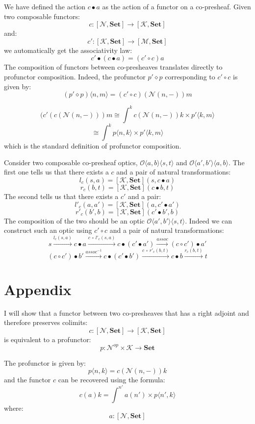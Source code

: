 \documentclass[11pt]{amsart}
\newcommand{\cat}[1]{\mathcal{#1}}%
\newcommand{\Cat}[1]{\mathbf{#1}}%
\newcommand{\Set}{\Cat{Set}}
\begin{document}
 We have defined the action $c \bullet a$ as the action of a functor on a co-presheaf. Given two composable functors:
\[ c \colon  [\cat N, \Set] \to [\cat K, \Set] \]
and:
\[ c' \colon  [\cat K, \Set] \to [\cat M, \Set] \]
we automatically get the associativity law:
\[ c' \bullet (c \bullet a) = (c' \circ c) a \]
The composition of functors between co-presheaves translates directly to profunctor composition. Indeed, the profunctor $p' \diamond p$ corresponding to $c' \circ c$ is given by:
\[(p' \diamond p) \langle n, m \rangle = (c' \circ c) ( \cat N(n, -)) m \]

\[(c' ( c ( \cat N(n, -))) m 
 \cong \int^{k} c ( \cat N(n, -)) k \times p' \langle k, m \rangle \]
\[  \cong \int^{k} p \langle n, k \rangle \times p' \langle k, m \rangle \]
which is the standard definition of profunctor composition. 

Consider two composable co-presheaf optics, $\mathcal{O}\langle a, b\rangle \langle s, t \rangle$ and $\mathcal{O}\langle a', b' \rangle \langle a, b \rangle$. The first one tells us that there exists a $c$ and a pair of natural transformations:
\[ l_c (s,  a ) = [\cat K, \Set] \left(s,  c \bullet a \right) \] 
\[ r_c (b, t) = [\cat K, \Set] \left(c \bullet b, t \right) \]
The second tells us that there exists a $c'$ and a pair:
\[ l'_c (a,  a' ) = [\cat K, \Set] \left(a,  c' \bullet a' \right) \] 
\[ r'_c (b', b) = [\cat K, \Set] \left(c' \bullet b', b \right) \]
The composition of the two should be an optic $\mathcal{O}\langle a', b'\rangle \langle s, t \rangle$. Indeed we can construct such an optic using $c' \circ c$ and a pair of natural transformations:
\[s \xrightarrow{l_c (s,  a )} c \bullet a \xrightarrow{c \,\circ \, l'_c (s,  a )} c \bullet (c' \bullet a')
  \xrightarrow{assoc} (c \circ c') \bullet a'\]
\[ (c \circ c') \bullet b' \xrightarrow{assoc^{-1}} c \bullet (c' \bullet b') \xrightarrow{c \, \circ \, r'_c (b, t)} c \bullet b
 \xrightarrow{r_c (b, t)}  t \]


\section{Appendix}

I will show that a functor between two co-presheaves that has a right adjoint and therefore preserves colimits:
\[ c \colon [\cat N, \Set] \to [\cat K, \Set] \]
is equivalent to a profunctor:
\[p \colon \cat N^{op} \times \cat K \to \Set \]

The profunctor is given by:
\[p \langle n, k \rangle = c ( \cat N(n, -)) k \]
and the functor $c$ can be recovered using the formula:
\[ c (a) k = \int^{n'} a (n') \times p \langle n', k \rangle \]
where:
\[ a \colon [\cat N, \Set] \]
\end{document}
